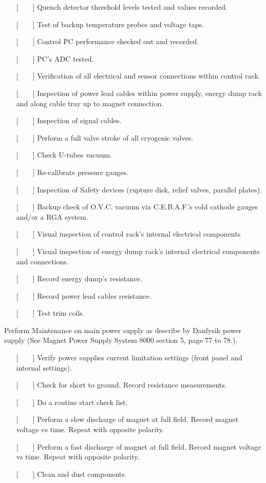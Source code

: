 \begin{itemize}
\item[{[~~~~]}] {Quench detector threshold levels tested and values recorded.}
\item[{[~~~~]}] {Test of backup temperature probes and voltage taps.}
\item[{[~~~~]}] {Control PC performance checked out and recorded.}
\item[{[~~~~]}] {PC's ADC tested.}
\item[{[~~~~]}] {Verification of all electrical and sensor connections within control
 rack.}
\item[{[~~~~]}] {Inspection of power lead cables within power supply, energy dump
rack and along cable tray up to magnet connection.}
\item[{[~~~~]}] {Inspection of signal cables.}
\item[{[~~~~]}]  {Perform a full valve stroke of all cryogenic valves.}
\item[{[~~~~]}] {Check U-tubes vacuum.}
\item[{[~~~~]}] {Re-calibrate pressure gauges.}
\item[{[~~~~]}] {Inspection of Safety devices (rupture disk, relief valves, parallel
plates).}
\item[{[~~~~]}] {Backup check of O.V.C. vacuum via C.E.B.A.F.'s cold cathode gauges
and/or a RGA system.}
\item[{[~~~~]}] {Visual inspection of control rack's internal electrical components}
\item[{[~~~~]}] {Visual inspection of energy dump rack's internal electrical
components and connections.}
\item[{[~~~~]}] {Record energy dump's resistance.}
\item[{[~~~~]}] {Record power lead cables resistance.}
\item[{[~~~~]}] {Test trim coils.}
\end{itemize}
Perform Maintenance on main power supply as describe by Danfysik 
power supply (See Magnet Power Supply System 8000 section 5, page 77 to 78.).
\begin{itemize}
\item[{[~~~~]}] {Verify power supplies current limitation settings (front panel and
internal settings).}
\item[{[~~~~]}] {Check for short to ground. Record resistance measurements.}
\item[{[~~~~]}]  {Do a routine start check list.}
\item[{[~~~~]}] {Perform a slow discharge of magnet at full field. Record magnet
voltage vs time. Repeat with opposite polarity.}
\item[{[~~~~]}] {Perform a fast discharge of magnet at full field. Record magnet
voltage vs time. Repeat with opposite polarity.}
\item[{[~~~~]}]  {Clean and dust components.}
\end{itemize}


